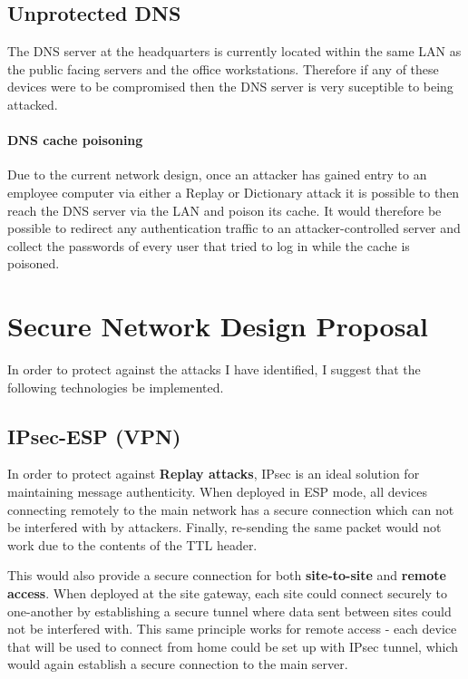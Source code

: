 \documentclass[11pt]{article}
\begin{document}
    \subsection{Unprotected DNS}
      The DNS server at the headquarters is currently located within the same LAN as the public facing servers and the office workstations. Therefore if any of these devices were to be compromised then the DNS server is very suceptible to being attacked.

      \paragraph{DNS cache poisoning}
        Due to the current network design, once an attacker has gained entry to an employee computer via either a Replay or Dictionary attack it is possible to then reach the DNS server via the LAN and poison its cache. It would therefore be possible to redirect any authentication traffic to an attacker-controlled server and collect the passwords of every user that tried to log in while the cache is poisoned.

    \section{Secure Network Design Proposal}
      In order to protect against the attacks I have identified, I suggest that the following technologies be implemented.

      \subsection{IPsec-ESP (VPN)}
        In order to protect against \textbf{Replay attacks}, IPsec is an ideal solution for maintaining message authenticity. When deployed in ESP mode, all devices connecting remotely to the main network has a secure connection which can not be interfered with by attackers. Finally, re-sending the same packet would not work due to the contents of the TTL header.

        This would also provide a secure connection for both \textbf{site-to-site} and \textbf{remote access}. When deployed at the site gateway, each site could connect securely to one-another by establishing a secure tunnel where data sent between sites could not be interfered with. This same principle works for remote access - each device that will be used to connect from home could be set up with IPsec tunnel, which would again establish a secure connection to the main server.
\end{document}
